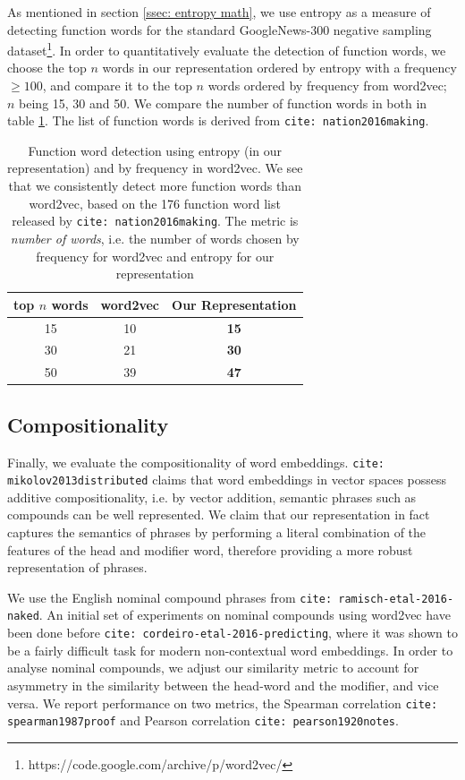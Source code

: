 \documentclass{book}
\newcommand{\citep}[1]{\texttt{cite: #1}}
\newcommand{\citet}[1]{\texttt{cite: #1}}
\begin{document}
As mentioned in section \ref{ssec: entropy math}, we use entropy as a measure
of detecting function words for the standard GoogleNews-300 negative sampling
dataset\footnote{https://code.google.com/archive/p/word2vec/}. In order to
quantitatively evaluate the detection of function words, we choose the top $n$
words in our representation ordered by entropy with a frequency $\geq 100$, and
compare it to the top $n$ words ordered by frequency from word2vec; $n$ being
15, 30 and 50. We compare the number of function words in both in table
\ref{tab: function word eval}. The list of function words is derived from
\citet{nation2016making}.

\begin{table}[]
    \centering
    {\small
    \begin{tabular}{c|cc}
        top $n$ words & \bf word2vec & \bf Our Representation  \\ \hline
        15  & 10 & \bf 15 \\
        30  & 21 & \bf 30 \\
        50  & 39 & \bf 47  \\
    \end{tabular}
    }
    \caption{Function word detection using entropy (in our representation) and by frequency in word2vec. We see that we consistently detect more function words than word2vec, based on the 176 function word list released by \citet{nation2016making}. The metric is \emph{number of words}, i.e. the number of words chosen by frequency for word2vec and entropy for our representation}
    \label{tab: function word eval}
\end{table}

\subsection{Compositionality}
\label{ssec: entailment}

Finally, we evaluate the compositionality of word embeddings.
\citet{mikolov2013distributed} claims that word embeddings in vector spaces
possess additive compositionality, i.e. by vector addition, semantic phrases
such as compounds can be well represented. We claim that our representation in
fact captures the semantics of phrases by performing a literal combination of
the features of the head and modifier word, therefore providing a more robust
representation of phrases.

We use the English nominal compound phrases from
\citet{ramisch-etal-2016-naked}. An initial set of experiments on nominal
compounds using word2vec have been done before
\citep{cordeiro-etal-2016-predicting}, where it was shown to be a fairly
difficult task for modern non-contextual word embeddings. In order to analyse
nominal compounds, we adjust our similarity metric to account for asymmetry in
the similarity between the head-word and the modifier, and vice versa. We
report performance on two metrics, the Spearman correlation
\citep{spearman1987proof} and Pearson correlation \citep{pearson1920notes}. 
\end{document}
